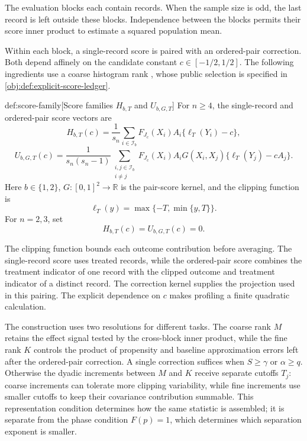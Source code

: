 The evaluation blocks  each contain  records. When the sample size is odd, the last record is left outside these blocks. Independence between the blocks permits their score inner product to estimate a squared population mean.

Within each block, a single-record score is paired with an ordered-pair correction. Both depend affinely on the candidate constant \(c\in[-1/2,1/2]\). The following ingredients use a coarse histogram rank , whose public selection is specified in \cref{obj:def:explicit-score-ledger}.

\begin{definitionv}{def:score-family}[Score families \(H_{b,T}\) and \(U_{b,G,T}\)]
For \(n\ge4\), the single-record and ordered-pair score vectors are
\[
H_{b,T}(c)=
\frac{1}{s_n}\sum_{i\in\mathcal I_b}
F_{J_{\mathrm c}}(X_i)A_i\{\ell_T(Y_i)-c\},
\]
\[
U_{b,G,T}(c)=
\frac{1}{s_n(s_n-1)}
\sum_{\substack{i,j\in\mathcal I_b\\i\ne j}}
F_{J_{\mathrm c}}(X_i)A_iG(X_i,X_j)
\{\ell_T(Y_j)-cA_j\}.
\]
Here \(b\in\{1,2\}\), \(G:[0,1]^2\to\mathbb R\) is the pair-score kernel, and the clipping function is
\[
\ell_T(y)=\max\{-T,\min\{y,T\}\}.
\]
For \(n=2,3\), set
\[
H_{b,T}(c)=U_{b,G,T}(c)=0.
\]
\end{definitionv}

The clipping function  bounds each outcome contribution before averaging. The single-record score  uses treated records, while the ordered-pair score  combines the treatment indicator of one record with the clipped outcome and treatment indicator of a distinct record. The correction kernel  supplies the projection used in this pairing. The explicit dependence on \(c\) makes profiling a finite quadratic calculation.

The construction uses two resolutions for different tasks. The coarse rank \(M\) retains the effect signal tested by the cross-block inner product, while the fine rank \(K\) controls the product of propensity and baseline approximation errors left after the ordered-pair correction. A single correction suffices when \(S\ge\gamma\) or \(\alpha\ge q\). Otherwise the dyadic increments between \(M\) and \(K\) receive separate cutoffs \(T_j\): coarse increments can tolerate more clipping variability, while fine increments use smaller cutoffs to keep their covariance contribution summable. This representation condition determines how the same statistic is assembled; it is separate from the phase condition \(F(p)=1\), which determines which separation exponent is smaller.

